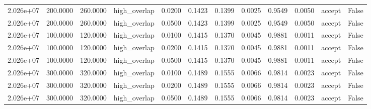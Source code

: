 \begin{table}[t]
\begin{tabular}{lrrrrrrrrrrr}
2.026e+07 & 200.0000 & 260.0000 & high\_overlap & 0.0200 & 0.1423 & 0.1399 & 0.0025 & 0.9549 & 0.0050 & accept & False \\
2.026e+07 & 200.0000 & 260.0000 & high\_overlap & 0.0500 & 0.1423 & 0.1399 & 0.0025 & 0.9549 & 0.0050 & accept & False \\
2.026e+07 & 100.0000 & 120.0000 & high\_overlap & 0.0100 & 0.1415 & 0.1370 & 0.0045 & 0.9881 & 0.0011 & accept & False \\
2.026e+07 & 100.0000 & 120.0000 & high\_overlap & 0.0200 & 0.1415 & 0.1370 & 0.0045 & 0.9881 & 0.0011 & accept & False \\
2.026e+07 & 100.0000 & 120.0000 & high\_overlap & 0.0500 & 0.1415 & 0.1370 & 0.0045 & 0.9881 & 0.0011 & accept & False \\
2.026e+07 & 300.0000 & 320.0000 & high\_overlap & 0.0100 & 0.1489 & 0.1555 & 0.0066 & 0.9814 & 0.0023 & accept & False \\
2.026e+07 & 300.0000 & 320.0000 & high\_overlap & 0.0200 & 0.1489 & 0.1555 & 0.0066 & 0.9814 & 0.0023 & accept & False \\
2.026e+07 & 300.0000 & 320.0000 & high\_overlap & 0.0500 & 0.1489 & 0.1555 & 0.0066 & 0.9814 & 0.0023 & accept & False \\
\bottomrule
\end{tabular}
\end{table}
